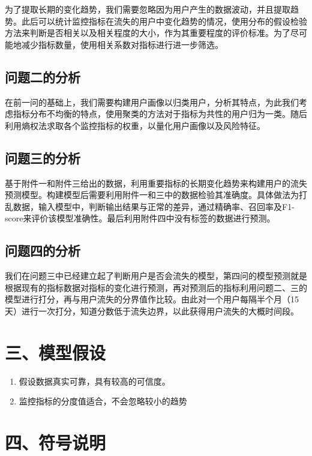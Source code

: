 \documentclass{my_paper}
\begin{document}
为了提取长期的变化趋势，我们需要忽略因为用户产生的数据波动，并且提取趋势。此后可以统计监控指标在流失的用户中变化趋势的情况，使用分布的假设检验方法来判断是否相关以及相关程度的大小，作为其重要程度的评价标准。为了尽可能地减少指标数量，使用相关系数对指标进行进一步筛选。

\subsection{问题二的分析}

在前一问的基础上，我们需要构建用户画像以归类用户，分析其特点，为此我们考虑指标分布不均衡的特点，使用聚类的方法对于指标为共性的用户归为一类。随后利用熵权法求取各个监控指标的权重，以量化用户画像以及风险特征。

\subsection{问题三的分析}
基于附件一和附件三给出的数据，利用重要指标的长期变化趋势来构建用户的流失预测模型。构建模型后需要利用附件一和三中的数据检验其准确度。具体做法为打乱数据，输入模型中，判断输出结果与正常的差异，通过精确率、召回率及F1-score来评价该模型准确性。最后利用附件四中没有标签的数据进行预测。

\subsection{问题四的分析}
我们在问题三中已经建立起了判断用户是否会流失的模型，第四问的模型预测就是根据现有的指标数据对指标的变化进行预测，再对预测后的指标利用问题二、三的模型进行打分，再与用户流失的分界值作比较。由此对一个用户每隔半个月（15天）进行一次打分，知道分数低于流失边界，以此获得用户流失的大概时间段。
\section{三、模型假设}
\begin{enumerate}
    \item 假设数据真实可靠，具有较高的可信度。
    \item 监控指标的分度值适合，不会忽略较小的趋势


\end{enumerate}

\section{四、符号说明}
\end{document}
